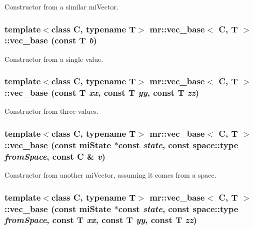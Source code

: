Constructor from a similar mi\-Vector. 

\subsubsection{\setlength{\rightskip}{0pt plus 5cm}template$<$class C, typename T$>$ {\bf mr::vec\_\-base}$<$ C, T $>$::{\bf vec\_\-base} (const T {\em b})\hspace{0.3cm}{\tt  [inline]}}\label{structmr_1_1vec__base_z58_4}


Constructor from a single value. 

\subsubsection{\setlength{\rightskip}{0pt plus 5cm}template$<$class C, typename T$>$ {\bf mr::vec\_\-base}$<$ C, T $>$::{\bf vec\_\-base} (const T {\em xx}, const T {\em yy}, const T {\em zz})\hspace{0.3cm}{\tt  [inline]}}\label{structmr_1_1vec__base_z58_5}


Constructor from three values. 

\subsubsection{\setlength{\rightskip}{0pt plus 5cm}template$<$class C, typename T$>$ {\bf mr::vec\_\-base}$<$ C, T $>$::{\bf vec\_\-base} (const mi\-State $\ast$const {\em state}, const {\bf space::type} {\em from\-Space}, const C \& {\em v})\hspace{0.3cm}{\tt  [inline]}}\label{structmr_1_1vec__base_z58_6}


Constructor from another mi\-Vector, assuming it comes from a space. 

\subsubsection{\setlength{\rightskip}{0pt plus 5cm}template$<$class C, typename T$>$ {\bf mr::vec\_\-base}$<$ C, T $>$::{\bf vec\_\-base} (const mi\-State $\ast$const {\em state}, const {\bf space::type} {\em from\-Space}, const T {\em xx}, const T {\em yy}, const T {\em zz})\hspace{0.3cm}{\tt  [inline]}}\label{structmr_1_1vec__base_z58_7}


